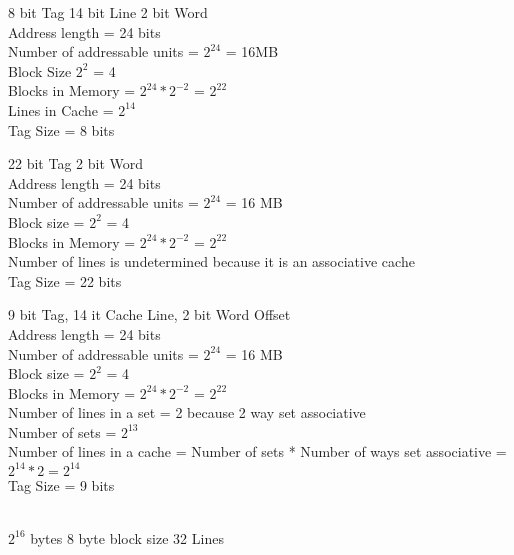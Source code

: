 \documentclass[12pt,largemargins]{homework}
\begin{document}
\begin{alphaparts}
\item
8 bit Tag 14 bit Line 2 bit Word\\
Address length = 24 bits\\
Number of addressable units = $2^24$ = 16MB\\
Block Size $2^2$ = 4\\
Blocks in Memory = $2^24*2^{-2}$ = $2^22$\\
Lines in Cache = $2^14$\\
Tag Size = 8 bits\\
\item
22 bit Tag 2 bit Word\\
Address length = 24 bits\\
Number of addressable units = $2^24$ = 16 MB\\
Block size = $2^2$ = 4\\
Blocks in Memory = $2^24*2^{-2}$ = $2^22$\\
Number of lines is undetermined because it is an associative cache\\
Tag Size = 22 bits\\
\item
9 bit Tag, 14 it Cache Line, 2 bit Word Offset\\
Address length = 24 bits\\
Number of addressable units = $2^24$ = 16 MB\\
Block size = $2^2$ = 4\\
Blocks in Memory = $2^24*2^{-2}$ = $2^22$\\
Number of lines in a set = 2 because 2 way set associative\\
Number of sets = $2^13$\\
Number of lines in a cache = Number of sets * Number of ways set associative = $2^14 * 2 = 2^14$\\
Tag Size = 9 bits
\end{alphaparts}
 \\
$2^16$ bytes $8$ byte block size 32 Lines\\
\end{document}

